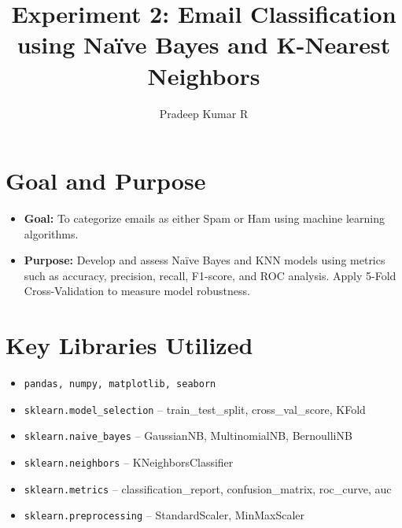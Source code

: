 \documentclass[12pt]{article}
\title{\textbf{Experiment 2: Email Classification using Naïve Bayes and K-Nearest Neighbors}}
\author{Pradeep Kumar R}
\date{}
\begin{document}
\maketitle

\section*{Goal and Purpose}
\begin{itemize}
  \item \textbf{Goal:} To categorize emails as either Spam or Ham using machine learning algorithms.
  \item \textbf{Purpose:} Develop and assess Naïve Bayes and KNN models using metrics such as accuracy, precision, recall, F1-score, and ROC analysis. Apply 5-Fold Cross-Validation to measure model robustness.
\end{itemize}

\section*{Key Libraries Utilized}
\begin{itemize}
  \item \texttt{pandas, numpy, matplotlib, seaborn}
  \item \texttt{sklearn.model\_selection} – train\_test\_split, cross\_val\_score, KFold
  \item \texttt{sklearn.naive\_bayes} – GaussianNB, MultinomialNB, BernoulliNB
  \item \texttt{sklearn.neighbors} – KNeighborsClassifier
  \item \texttt{sklearn.metrics} – classification\_report, confusion\_matrix, roc\_curve, auc
  \item \texttt{sklearn.preprocessing} – StandardScaler, MinMaxScaler
\end{itemize}
\end{document}

